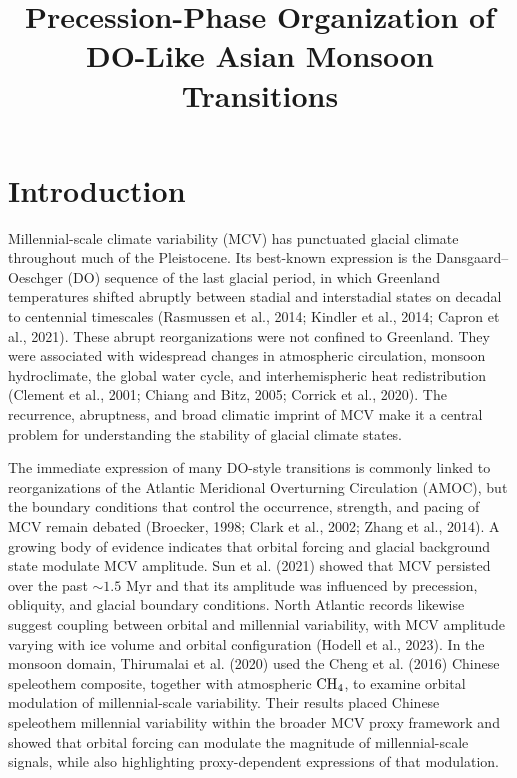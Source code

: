 \documentclass[11pt]{article}
\title{Precession-Phase Organization of DO-Like Asian Monsoon Transitions}
\author{}
\date{}
\begin{document}
\maketitle

\section*{Introduction}

Millennial-scale climate variability (MCV) has punctuated glacial climate throughout much of the Pleistocene. Its best-known expression is the Dansgaard--Oeschger (DO) sequence of the last glacial period, in which Greenland temperatures shifted abruptly between stadial and interstadial states on decadal to centennial timescales (Rasmussen et al., 2014; Kindler et al., 2014; Capron et al., 2021). These abrupt reorganizations were not confined to Greenland. They were associated with widespread changes in atmospheric circulation, monsoon hydroclimate, the global water cycle, and interhemispheric heat redistribution (Clement et al., 2001; Chiang and Bitz, 2005; Corrick et al., 2020). The recurrence, abruptness, and broad climatic imprint of MCV make it a central problem for understanding the stability of glacial climate states.

The immediate expression of many DO-style transitions is commonly linked to reorganizations of the Atlantic Meridional Overturning Circulation (AMOC), but the boundary conditions that control the occurrence, strength, and pacing of MCV remain debated (Broecker, 1998; Clark et al., 2002; Zhang et al., 2014). A growing body of evidence indicates that orbital forcing and glacial background state modulate MCV amplitude. Sun et al. (2021) showed that MCV persisted over the past \(\sim1.5\) Myr and that its amplitude was influenced by precession, obliquity, and glacial boundary conditions. North Atlantic records likewise suggest coupling between orbital and millennial variability, with MCV amplitude varying with ice volume and orbital configuration (Hodell et al., 2023). In the monsoon domain, Thirumalai et al. (2020) used the Cheng et al. (2016) Chinese speleothem composite, together with atmospheric \(\ce{CH4}\), to examine orbital modulation of millennial-scale variability. Their results placed Chinese speleothem millennial variability within the broader MCV proxy framework and showed that orbital forcing can modulate the magnitude of millennial-scale signals, while also highlighting proxy-dependent expressions of that modulation.
\end{document}
